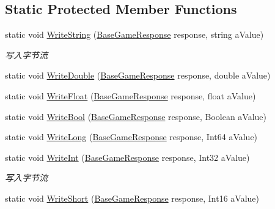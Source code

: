 \subsection*{Static Protected Member Functions}
\begin{DoxyCompactItemize}
\item 
static void \mbox{\hyperlink{class_t_net_1_1_service_1_1_data_struct_a6c8ccf0cec1bef9038e69048e9b7f268}{Write\+String}} (\mbox{\hyperlink{class_t_net_1_1_service_1_1_base_game_response}{Base\+Game\+Response}} response, string a\+Value)
\begin{DoxyCompactList}\small\item\em 写入字节流 \end{DoxyCompactList}\item 
static void \mbox{\hyperlink{class_t_net_1_1_service_1_1_data_struct_a1a6d1148fadada00a8a1a9490393a3a1}{Write\+Double}} (\mbox{\hyperlink{class_t_net_1_1_service_1_1_base_game_response}{Base\+Game\+Response}} response, double a\+Value)
\item 
static void \mbox{\hyperlink{class_t_net_1_1_service_1_1_data_struct_a71963b8cb015e81f2c808bf05f643ba0}{Write\+Float}} (\mbox{\hyperlink{class_t_net_1_1_service_1_1_base_game_response}{Base\+Game\+Response}} response, float a\+Value)
\item 
static void \mbox{\hyperlink{class_t_net_1_1_service_1_1_data_struct_ac6bd27b6b5ce000f40712a450bb3369f}{Write\+Bool}} (\mbox{\hyperlink{class_t_net_1_1_service_1_1_base_game_response}{Base\+Game\+Response}} response, Boolean a\+Value)
\item 
static void \mbox{\hyperlink{class_t_net_1_1_service_1_1_data_struct_a81c8878685f305745bac43b205098b09}{Write\+Long}} (\mbox{\hyperlink{class_t_net_1_1_service_1_1_base_game_response}{Base\+Game\+Response}} response, Int64 a\+Value)
\item 
static void \mbox{\hyperlink{class_t_net_1_1_service_1_1_data_struct_ac1fb1c8e32acefb3e5d855c7f60e924a}{Write\+Int}} (\mbox{\hyperlink{class_t_net_1_1_service_1_1_base_game_response}{Base\+Game\+Response}} response, Int32 a\+Value)
\begin{DoxyCompactList}\small\item\em 写入字节流 \end{DoxyCompactList}\item 
static void \mbox{\hyperlink{class_t_net_1_1_service_1_1_data_struct_adb0cd7ce8fac39a7609c71bd9962d615}{Write\+Short}} (\mbox{\hyperlink{class_t_net_1_1_service_1_1_base_game_response}{Base\+Game\+Response}} response, Int16 a\+Value)

\end{DoxyCompactItemize}
